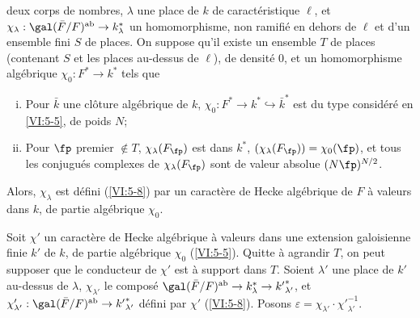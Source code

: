 \begin{theorem_}\label{VI:5-10}
 deux corps de nombres, $\lambda$ une place de $k$ de 
caractéristique $\ell$, et 
$\chi_\lambda:\gal(\bar F/F)^\textnormal{ab}\to k_\lambda^\ast$ un 
homomorphisme, non ramifié en dehors de $\ell$ et d'un ensemble fini $S$ de 
places. On suppose qu'il existe un ensemble $T$ de places (contenant $S$ et les 
places au-dessus de $\ell$), de densité $0$, et un homomorphisme algébrique 
$\chi_0:F^\ast \to k^\ast$ tels que 
\begin{enumerate}[(i)]
  \item Pour $\bar k$ une clôture algébrique de $k$, 
    $\chi_0:F^\ast \to k^\ast \hookrightarrow \bar k^\ast$ est du type 
    considéré en \ref{VI:5-5}, de poids $N$; 
\item Pour $\fp$ premier $\notin T$, $\chi_\lambda(F_\fp)$ est dans 
    $k^\ast$, $(\chi_\lambda(F_\fp))=\chi_0(\fp)$, et tous les conjugués 
    complexes de $\chi_\lambda(F_\fp)$ sont de valeur absolue $(N \fp)^{N/2}$. 
\end{enumerate}

Alors, $\chi_\lambda$ est défini (\ref{VI:5-8}) par un caractère de Hecke 
algébrique de $F$ à valeurs dans $k$, de partie algébrique $\chi_0$. 
\end{theorem_}

Soit $\chi'$ un caractère de Hecke algébrique à valeurs dans une 
extension galoisienne finie $k'$ de $k$, de partie algébrique $\chi_0$ 
(\ref{VI:5-5}). Quitte à agrandir $T$, on peut supposer que le conducteur de 
$\chi'$ est à support dans $T$. Soient $\lambda'$ une place de $k'$ au-dessus 
de $\lambda$, $\chi_{\lambda'}$ le composé 
$\gal(\bar F/F)^\text{ab}\to k_\lambda^\ast \to {k'}_{\lambda'}^\ast$, et 
$\chi_{\lambda'}':\gal(\bar F/F)^\text{ab}\to {k'}_{\lambda'}^\ast$ défini 
par $\chi'$ (\ref{VI:5-8}). Posons 
$\varepsilon = \chi_{\lambda'} \cdot {\chi'}_{\lambda'}^{-1}$. 

